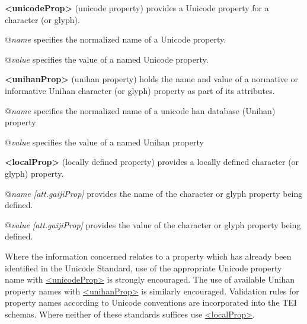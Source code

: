 \begin{sansreflist}
  
\item [\textbf{<unicodeProp>}] (unicode property) provides a Unicode property for a character (or glyph).\hfil\\[-10pt]\begin{sansreflist}
    \item[@{\itshape name}]
  specifies the normalized name of a Unicode property.
    \item[@{\itshape value}]
  specifies the value of a named Unicode property.
\end{sansreflist}  
\item [\textbf{<unihanProp>}] (unihan property) holds the name and value of a normative or informative Unihan character (or glyph) property as part of its attributes.\hfil\\[-10pt]\begin{sansreflist}
    \item[@{\itshape name}]
  specifies the normalized name of a unicode han database (Unihan) property
    \item[@{\itshape value}]
  specifies the value of a named Unihan property
\end{sansreflist}  
\item [\textbf{<localProp>}] (locally defined property) provides a locally defined character (or glyph) property.\hfil\\[-10pt]\begin{sansreflist}
    \item[@{\itshape name [att.gaijiProp]}]
  provides the name of the character or glyph property being defined.
    \item[@{\itshape value [att.gaijiProp]}]
  provides the value of the character or glyph property being defined.
\end{sansreflist}  
\end{sansreflist}
\par
Where the information concerned relates to a property which has already been identified in the Unicode Standard, use of the appropriate Unicode property name with \hyperref[TEI.unicodeProp]{<unicodeProp>} is strongly encouraged. The use of available Unihan property names with \hyperref[TEI.unihanProp]{<unihanProp>} is similarly encouraged. Validation rules for property names  according to Unicode conventions are incorporated into the TEI schemas. Where neither of these standards suffices use \hyperref[TEI.localProp]{<localProp>}.\par
